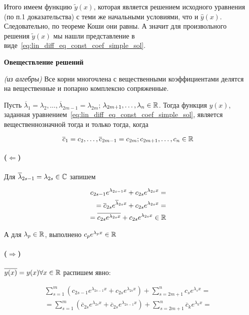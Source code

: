 Итого имеем функцию $\tilde{y}(x)$, которая является решением исходного уравнения (по п.1 доказательства) с теми же начальными условиями, что и $\hat{y}(x)$.
Следовательно, по теореме Коши они равны.
А значит для произвольного решения $\tilde{y}(x)$ мы нашли представление в виде~\ref{eq:lin_diff_eq_const_coef_simple_sol}.

\Endproof

\textbf{Овеществление решений}

\Statement \textit{(из алгебры)} Все корни многочлена с вещественными коэффициентами делятся на вещественные и попарно комплексно сопряженные.

\Statement Пусть $\overline{\lambda}_1 = \lambda_2, \dots, \overline{\lambda}_{2m-1} = \lambda_{2m}$; $\lambda_{2m+1}, \dots, \lambda_n \in \mathbb{R}$. Тогда функция $y(x)$, заданная уравнением~\ref{eq:lin_diff_eq_const_coef_simple_sol}, является вещественнозначной тогда и только тогда, когда

\begin{equation*}
    \overline{c}_1 = c_2, \dots, \overline{c}_{2m-1} = c_{2m}; c_{2m+1}, \dots, c_n \in \mathbb{R}
\end{equation*}

\Proof

\paragraph{($\Leftarrow$)} Для $\overline{\lambda}_{2s-1} = \lambda_{2s} \in \mathbb{C}$ запишем

\begin{align*}
    c_{2s-1} e^{\lambda_{2s-1} x} + c_{2s} e^{\lambda_{2s} x} = \\
    = \overline{c}_{2s} e^{\overline{\lambda}_{2s} x} + c_{2s} e^{\lambda_{2s} x} = \\
    = \overline{c_{2s} e^{\lambda_{2s} x}} + c_{2s} e^{\lambda_{2s} x} \in \mathbb{R}
\end{align*}

А для $\lambda_p \in \mathbb{R}$, выполнено $c_p e^{\lambda_p x} \in \mathbb{R}$

\paragraph{($\Rightarrow$)} $\overline{y(x)} = y(x) \forall x \in \mathbb{R}$ распишем явно:

\begin{align*}
    \sum_{s=1}^m \left(c_{2s-1} e^{\lambda_{2s-1} x} + c_{2s} e^{\lambda_{2s} x}\right) + \sum_{s=2m+1}^n c_s e^{\lambda_s x} = \\
    = \sum_{s=1}^m \left(\overline{c}_{2s} e^{\lambda_{2s} x} + \overline{c}_{2s} e^{\lambda_{2s-1} x}\right) + \sum_{s=2m+1}^n \overline{c}_k e^{\lambda_k x} = \\
\end{align*}

